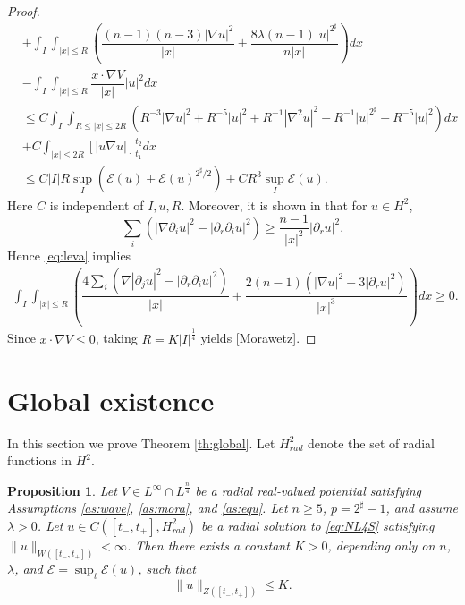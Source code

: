 \documentclass[11pt,a4paper]{article}
\numberwithin{equation}{section}
\newtheorem{proposition}[theorem]{Proposition}
\begin{document}
\begin{proof}
\begin{equation}
\begin{aligned}
&+ \int_{I}\int_{|x| \leq R}\left( \dfrac{(n-1)(n-3)|\nabla u|^{2}}{|x|} + \dfrac{8\lambda (n - 1)|u|^{2^{\sharp}}}{n|x|}\right) dx\\
&- \int_{I}\int_{|x| \leq R} \dfrac{x \cdot \nabla V}{|x|}|u|^{2} dx \\
&\leq C\int_{I}\int_{R \leq |x| \leq 2R} \left(R^{-3}|\nabla u|^{2} + R^{-5}|u|^{2} + R^{-1}|\nabla^{2}u|^{2} + R^{-1}|u|^{2^{\sharp}} + R^{-5}|u|^{2}\right)dx \\
&+ C\int_{|x| \leq 2R}\left[ |u\nabla u| \right]_{t_{1}}^{t_{2}}dx \\
&\leq C|I|R\sup_{I}\left(\mathcal{E}(u) + \mathcal{E}(u)^{2^{\sharp}/2}\right) + CR^{3}\sup_{I}\mathcal{E}(u).
\end{aligned}
\end{equation}
Here $C$ is independent of $I,u,R$.
Moreover, it is shown in \cite{Leva} that for $u \in H^{2}$,
\begin{equation}\label{eq:leva}
\sum_{i}\left( |\nabla \partial_{i}u|^{2} - |\partial_{r}\partial_{i}u|^{2}\right) \geq \dfrac{n-1}{|x|^{2}}|\partial_{r}u|^{2}.
\end{equation}
Hence \eqref{eq:leva} implies
\begin{align*}
\int_{I}\int_{|x| \leq R}\left( \dfrac{4\sum_{i}(\nabla|\partial_{j}u|^{2} - |\partial_{r}\partial_{i}u|^{2})}{|x|} + \dfrac{2(n-1)(|\nabla u|^{2}-3|\partial_{r}u|^{2})}{|x|^{3}}\right) dx \geq 0.
\end{align*}
Since $x \cdot \nabla V \leq 0$, taking $R = K|I|^{\frac{1}{4}}$ yields \eqref{Morawetz}.
\end{proof}

\section{Global existence}

In this section we prove Theorem \ref{th:global}. Let $H^{2}_{rad}$ denote the set of radial functions in $H^{2}$.

\begin{proposition}\label{prepare main thm}
Let $V \in L^{\infty} \cap L^{\frac{n}{4}}$ be a radial real-valued potential satisfying Assumptions \ref{as:wave}, \ref{as:mora}, and \ref{as:equ}. Let $n \geq 5$, $p = 2^{\sharp} - 1$, and assume $\lambda > 0$.
Let $u \in C([t_{-}, t_{+}], H^{2}_{rad})$ be a radial solution to \eqref{eq:NL4S} satisfying $\|u\|_{W([t_{-}, t_{+}])} < \infty$.
Then there exists a constant $K > 0$, depending only on $n$, $\lambda$, and $\mathcal{E} = \sup_{t}\mathcal{E}(u)$, such that
\begin{equation}\label{bound of z norm}
\|u\|_{Z([t_{-}, t_{+}])} \leq K.
\end{equation}
\end{proposition}
\end{document}
